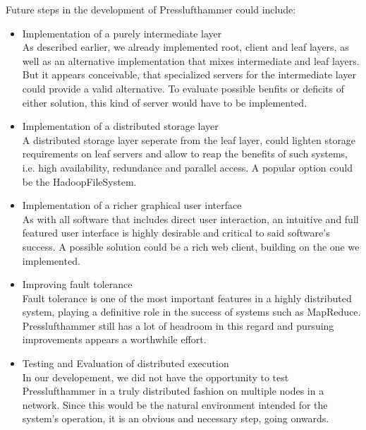   Future steps in the development of Presslufthammer could include:
  \begin{itemize}
    \item Implementation of a purely intermediate layer\\
      As described earlier, we already implemented root, client and leaf layers,
      as well as an alternative implementation that mixes intermediate and leaf
      layers. But it appears conceivable, that specialized servers for the
      intermediate layer could provide a valid alternative.
      To evaluate possible benfits or deficits of either solution, this kind of
      server would have to be implemented.
    
    \item Implementation of a distributed storage layer\\
      A distributed storage layer seperate from the leaf layer, could lighten
      storage requirements on leaf servers and allow to reap the benefits of
      such systems, i.e. high availability, redundance and parallel access.
      A popular option could be the HadoopFileSystem.
    
    \item Implementation of a richer graphical user interface\\
      As with all software that includes direct user interaction, an intuitive
      and full featured user interface is highly desirable and critical to 
      said software's success. A possible solution could be a rich web client,
      building on the one we implemented.
    
    \item Improving fault tolerance\\
      Fault tolerance is one of the most important features in a highly
      distributed system, playing a definitive role in the success of systems
      such as MapReduce. Presslufthammer still has a lot of headroom in this
      regard and pursuing improvements appears a worthwhile effort.
    
    \item Testing and Evaluation of distributed execution\\
      In our developement, we did not have the opportunity to test
      Presslufthammer in a truly distributed fashion on multiple nodes in a
      network. Since this would be the natural environment intended for the
      system's operation, it is an obvious and necessary step, going onwards.
    

\end{itemize}
